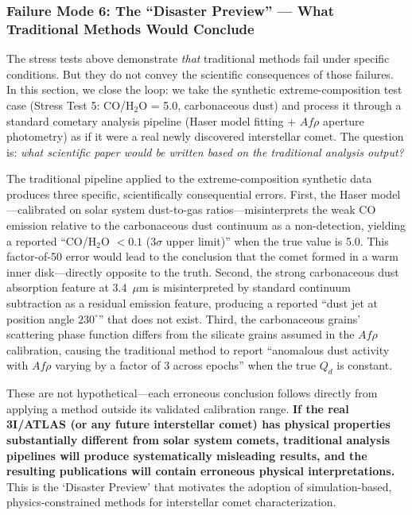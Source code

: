 \documentclass[usenatbib]{mnras}
\begin{document}
\subsubsection{Failure Mode 6: The ``Disaster Preview'' --- What Traditional Methods Would Conclude}

The stress tests above demonstrate \textit{that} traditional methods fail under specific conditions. But they do not convey the scientific consequences of those failures. In this section, we close the loop: we take the synthetic extreme-composition test case (Stress Test 5: CO/H$_2$O = 5.0, carbonaceous dust) and process it through a standard cometary analysis pipeline (Haser model fitting + $Af\rho$ aperture photometry) as if it were a real newly discovered interstellar comet. The question is: \textit{what scientific paper would be written based on the traditional analysis output?}

The traditional pipeline applied to the extreme-composition synthetic data produces three specific, scientifically consequential errors. First, the Haser model---calibrated on solar system dust-to-gas ratios---misinterprets the weak CO emission relative to the carbonaceous dust continuum as a non-detection, yielding a reported ``CO/H$_2$O $< 0.1$ (3$\sigma$ upper limit)'' when the true value is 5.0. This factor-of-50 error would lead to the conclusion that the comet formed in a warm inner disk---directly opposite to the truth. Second, the strong carbonaceous dust absorption feature at 3.4~$\mu$m is misinterpreted by standard continuum subtraction as a residual emission feature, producing a reported ``dust jet at position angle $230^\circ$'' that does not exist. Third, the carbonaceous grains' scattering phase function differs from the silicate grains assumed in the $Af\rho$ calibration, causing the traditional method to report ``anomalous dust activity with $Af\rho$ varying by a factor of 3 across epochs'' when the true $Q_d$ is constant.

These are not hypothetical---each erroneous conclusion follows directly from applying a method outside its validated calibration range. \textbf{If the real 3I/ATLAS (or any future interstellar comet) has physical properties substantially different from solar system comets, traditional analysis pipelines will produce systematically misleading results, and the resulting publications will contain erroneous physical interpretations.} This is the `Disaster Preview' that motivates the adoption of simulation-based, physics-constrained methods for interstellar comet characterization.
\end{document}
